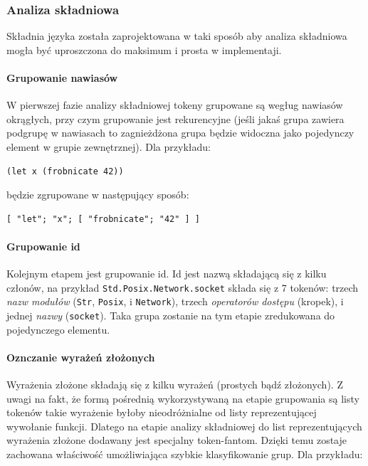 \documentclass[11pt,oneside,a4paper,titlepage,onecolumn]{article}
\begin{document}
\subsubsection{Analiza składniowa}
\label{opis_etapow_kompilacji_analiza_skladniowa}

Składnia języka została zaprojektowana w taki sposób aby analiza składniowa mogła być uproszczona do maksimum
i prosta w implementaji.

\paragraph{Grupowanie nawiasów}

W pierwszej fazie analizy składniowej tokeny grupowane są wegług nawiasów okrągłych, przy czym grupowanie jest
rekurencyjne (jeśli jakaś grupa zawiera podgrupę w nawiasach to zagnieżdżona grupa będzie widoczna jako
pojedynczy element w grupie zewnętrznej).
Dla przykładu:

\begin{lstlisting}
(let x (frobnicate 42))
\end{lstlisting}

będzie zgrupowane w następujący sposób:

\begin{lstlisting}
[ "let"; "x"; [ "frobnicate"; "42" ] ]
\end{lstlisting}

\paragraph{Grupowanie id}

Kolejnym etapem jest grupowanie id. Id jest nazwą składającą się z kilku członów, na przykład
\texttt{Std.Posix.Network.socket} składa się z 7 tokenów: trzech \emph{nazw modułów} (\texttt{Str},
\texttt{Posix}, i \texttt{Network}), trzech \emph{operatorów dostępu} (kropek), i jednej \emph{nazwy}
(\texttt{socket}).
Taka grupa zostanie na tym etapie zredukowana do pojedynczego elementu.

\paragraph{Oznczanie wyrażeń złożonych}

Wyrażenia złożone składają się z kilku wyrażeń (prostych bądź złożonych). Z uwagi na fakt, że formą pośrednią
wykorzystywaną na etapie grupowania są listy tokenów takie wyrażenie byłoby nieodróżnialne od listy
reprezentującej wywołanie funkcji. Dlatego na etapie analizy składniowej do list reprezentujących wyrażenia
złożone dodawany jest specjalny token-fantom. Dzięki temu zostaje zachowana właściwość umożliwiająca szybkie
klasyfikowanie grup. Dla przykładu:
\end{document}
